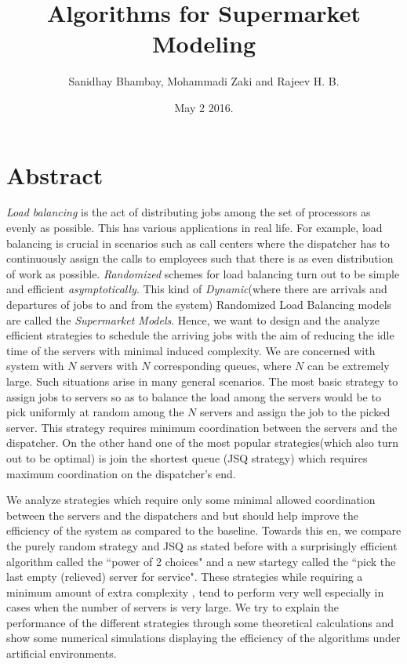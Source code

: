 \documentclass[a4paper,english,11pt]{article}
\title{Algorithms for Supermarket Modeling}
\date{May 2 2016.}
\author{Sanidhay Bhambay, Mohammadi Zaki and Rajeev H. B.}
\begin{document}
\maketitle

\section{Abstract}
\textit{Load balancing} is the act of distributing jobs among the set of processors as evenly as possible. This has various applications in real life. For example, load balancing is crucial in scenarios such as call centers where the dispatcher has to continuously assign the calls to  employees such that there is as even distribution of work as possible. \textit{Randomized} schemes for load balancing turn out to be simple and efficient \textit{asymptotically}. This kind of \textit{Dynamic}(where there are arrivals and departures of jobs to and from the system) Randomized Load Balancing models are called the \textit{Supermarket Models}. Hence, we want to design and the analyze efficient strategies to schedule the arriving jobs with the aim of reducing the idle time of the servers with minimal induced complexity. We are concerned with system with $N$ servers with $N$ corresponding queues, where $N$ can be extremely large. Such situations arise in many general scenarios. The most basic strategy to assign jobs to servers so as to balance the load among the servers would be to pick uniformly at random among the $N$ servers and assign the job to the picked server. This strategy requires minimum coordination between the servers and the dispatcher. On the other hand one of the most popular strategies(which also turn out to be optimal) is join the shortest queue (JSQ strategy) which requires maximum coordination on the dispatcher's end.
\par We analyze strategies which  require only some  minimal allowed  coordination between the servers and the dispatchers and but should help improve the efficiency of the system as compared to the baseline. Towards this en, we compare the purely random strategy and JSQ as stated before with a surprisingly efficient algorithm called the ``power of 2 choices" and a new startegy called the ``pick the last empty (relieved) server for service". These strategies while requiring a minimum amount of extra complexity , tend to perform very well especially in cases when the number of servers is very large. We try to explain the performance of the different strategies through some theoretical calculations and show some numerical simulations displaying the efficiency of the algorithms under artificial environments. 
\end{document}
